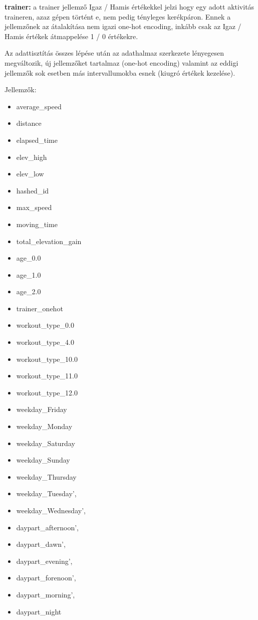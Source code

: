 \textbf{trainer: } a trainer jellemző Igaz / Hamis értékekkel jelzi hogy egy adott aktivitás traineren, azaz gépen történt e, nem pedig tényleges kerékpáron. Ennek a jellemzőnek az átalakítása nem igazi one-hot encoding, inkább csak az Igaz / Hamis értékek átmappelése 1 / 0 értékekre.  


Az adattisztítás összes lépése után az adathalmaz szerkezete lényegesen megváltozik, új jellemzőket tartalmaz (one-hot encoding) valamint az eddigi jellemzők sok esetben más intervallumokba esnek (kiugró értékek kezelése).

Jellemzők:
\begin{itemize}
	\item average\_speed
	\item distance
	\item elapsed\_time
	\item elev\_high
	\item elev\_low
	
	\item hashed\_id 
	\item max\_speed
	\item moving\_time
	\item total\_elevation\_gain
	\item age\_0.0 
	\item age\_1.0
	\item age\_2.0
	\item trainer\_onehot
	\item workout\_type\_0.0
	\item workout\_type\_4.0 
	\item workout\_type\_10.0 
	\item workout\_type\_11.0
	\item workout\_type\_12.0
	\item weekday\_Friday 
	\item weekday\_Monday
	\item weekday\_Saturday 
	\item weekday\_Sunday 
	\item weekday\_Thursday
	\item weekday\_Tuesday', 
	\item weekday\_Wednesday', 
	\item daypart\_afternoon',
	\item daypart\_dawn', 
	\item daypart\_evening', 
	\item daypart\_forenoon',
	\item daypart\_morning', 
	\item daypart\_night
\end{itemize}


